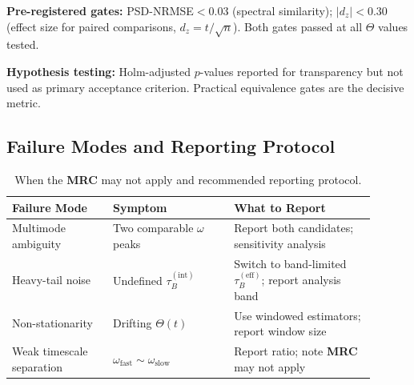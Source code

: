 \documentclass[11pt,letterpaper]{article}
\DeclareRobustCommand{\mrc}{\textbf{MRC}\xspace}
\begin{document}
\textbf{Pre-registered gates:} PSD-NRMSE$<0.03$ (spectral similarity); $|d_z|<0.30$ (effect size for paired comparisons, $d_z = t/\sqrt{n}$). Both gates passed at all $\Theta$ values tested.

\textbf{Hypothesis testing:} Holm-adjusted $p$-values reported for transparency but not used as primary acceptance criterion. Practical equivalence gates are the decisive metric.

\subsection*{Failure Modes and Reporting Protocol}

\begin{table}[h!]
\centering
\caption{When the \mrc may not apply and recommended reporting protocol.}
\label{tab:failures}
\begin{tabular}{@{}p{0.25\linewidth}p{0.30\linewidth}p{0.35\linewidth}@{}}
\toprule
Failure Mode & Symptom & What to Report \\
\midrule
Multimode ambiguity & Two comparable $\omega$ peaks & Report both candidates; sensitivity analysis \\
Heavy-tail noise & Undefined $\tau_B^{(\mathrm{int})}$ & Switch to band-limited $\tau_B^{(\mathrm{eff})}$; report analysis band \\
Non-stationarity & Drifting $\Theta(t)$ & Use windowed estimators; report window size \\
Weak timescale separation & $\omega_{\mathrm{fast}}\sim\omega_{\mathrm{slow}}$ & Report ratio; note \mrc may not apply \\
\bottomrule
\end{tabular}
\end{table}

\FloatBarrier


\end{document}
